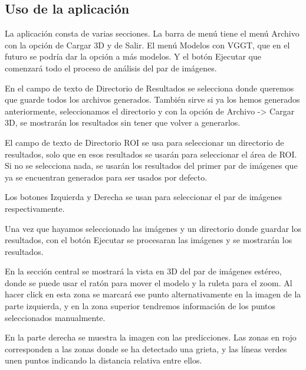\subsection{Uso de la aplicación}
La aplicación consta de varias secciones. La barra de menú tiene el menú Archivo con la opción de Cargar 3D y de Salir. El menú Modelos con VGGT, que en el futuro se podría dar la opción a más modelos. Y el botón Ejecutar que comenzará todo el proceso de análisis del par de imágenes.


En el campo de texto de Directorio de Resultados se selecciona donde queremos que guarde todos los archivos generados. También sirve si ya los hemos generados anteriormente, seleccionamos el directorio y con la opción de Archivo -> Cargar 3D, se mostrarán los resultados sin tener que volver a generarlos.

El campo de texto de Directorio ROI se usa para seleccionar un directorio de resultados, solo que en esos resultados se usarán para seleccionar el área de ROI. Si no se selecciona nada, se usarán los resultados del primer par de imágenes que ya se encuentran generados para ser usados por defecto.

Los botones Izquierda y Derecha se usan para seleccionar el par de imágenes respectivamente.

Una vez que hayamos seleccionado las imágenes y un directorio donde guardar los resultados, con el botón Ejecutar se procesaran las imágenes y se mostrarán los resultados.


En la sección central se mostrará la vista en 3D del par de imágenes estéreo, donde se puede usar el ratón para mover el modelo y la ruleta para el zoom. Al hacer click en esta zona se marcará ese punto alternativamente en la imagen de la parte izquierda, y en la zona superior tendremos información de los puntos seleccionados manualmente.

En la parte derecha se muestra la imagen con las predicciones. Las zonas en rojo corresponden a las zonas donde se ha detectado una grieta, y las líneas verdes unen puntos indicando la distancia relativa entre ellos.
